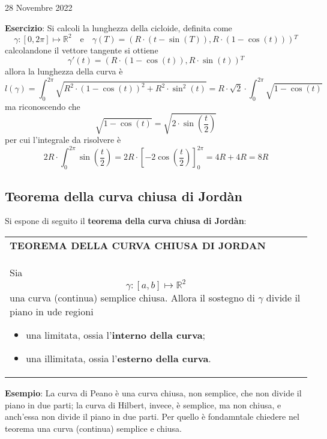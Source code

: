 \documentclass[a4paper]{extarticle}
\renewcommand\arraystretch{}
\begin{document}
\newpage
\noindent
\begin{center}
    28 Novembre 2022
\end{center}
\vspace{1em}
\noindent
\textbf{Esercizio}: Si calcoli la lunghezza della cicloide, definita come
\[\gamma : [0,2\pi] \longmapsto \mathbb{R}^2 \hspace{1em} \text{e} \hspace{1em} \gamma(T) = \left(R \cdot (t-\sin(T)), R \cdot (1-\cos(t))\right){^T}\]
calcolandone il vettore tangente si ottiene
\[\gamma'(t) = (R \cdot (1-\cos(t)), R \cdot \sin(t)){^T}\]
allora la lunghezza della curva è
\[l(\gamma) = \int_0^{2\pi} \sqrt{R^2 \cdot (1-\cos(t))^2 + R^2 \cdot \sin^2(t)} = R \cdot \sqrt{2} \cdot \int_0^{2\pi} \sqrt{1-\cos(t)}\]
ma riconoscendo che
\[\sqrt{1-\cos(t)} = \sqrt{2 \cdot \sin \left(\dfrac{t}{2}\right)}\]
per cui l'integrale da risolvere è
\[2R \cdot \int_0^{2\pi} \sin \left(\dfrac{t}{2}\right) = 2R \cdot \left[- 2 \cos\left(\dfrac{t}{2}\right)\right]_0^{2\pi} = 4R+4R=8R\]

\vspace{1em}
\noindent
\subsection{Teorema della curva chiusa di Jordàn}
Si espone di seguito il \textbf{teorema della curva chiusa di Jordàn}:

\vspace{1em}
\setlength{\tabcolsep}{14pt}
\renewcommand{\arraystretch}{2}
\noindent
\begin{tabularx}{\textwidth}{@{}|P|@{}}
    \hline
    {\textbf{TEOREMA DELLA CURVA CHIUSA DI JORDAN}}\\
    \parbox{\linewidth}{Sia
    \[\gamma : [a,b] \longmapsto \mathbb{R}^2\]
    una curva (continua) semplice chiusa. Allora il sostegno di $\gamma$ divide il piano in ude regioni
    \begin{itemize}
        \item una limitata, ossia l'\textbf{interno della curva};
        \item una illimitata, ossia l'\textbf{esterno della curva}.
    \end{itemize}
    \vspace{1mm}}\\
    \hline
\end{tabularx}

\vspace{2em}
\noindent
\textbf{Esempio}: La curva di Peano è una curva chiusa, non semplice, che non divide il piano in due parti; la curva di Hilbert, invece, è semplice, ma non chiusa, e anch'essa non divide il piano in due parti. Per quello è fondamntale chiedere nel teorema una curva (continua) semplice e chiusa.
\end{document}

